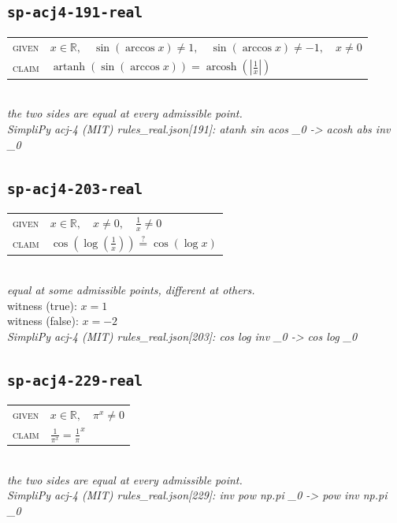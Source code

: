 \documentclass[11pt]{article}
\begin{document}
\subsection*{\texttt{sp-acj4-191-real}}
\begin{tabular}{@{}l@{\quad}l@{}}
\textsc{given} & $x \in \mathbb{R},\quad \sin\left(\arccos x\right) \neq 1,\quad \sin\left(\arccos x\right) \neq -1,\quad x \neq 0$ \\[4pt]
\textsc{claim} & $\displaystyle \operatorname{artanh}\left(\sin\left(\arccos x\right)\right) = \operatorname{arcosh}\left(\left|\frac{1}{x}\right|\right)$ \\
\end{tabular}\\[2pt]
{\small\emph{the two sides are equal at every admissible point.}}\\
\emph{SimpliPy acj-4 (MIT) rules\_real.json[191]: atanh sin acos \_0  ->  acosh abs inv \_0}\\

\subsection*{\texttt{sp-acj4-203-real}}
\begin{tabular}{@{}l@{\quad}l@{}}
\textsc{given} & $x \in \mathbb{R},\quad x \neq 0,\quad \frac{1}{x} \neq 0$ \\[4pt]
\textsc{claim} & $\displaystyle \cos\left(\log\left(\frac{1}{x}\right)\right) \overset{?}{=} \cos\left(\log x\right)$ \\
\end{tabular}\\[2pt]
{\small\emph{equal at some admissible points, different at others.}}\\
{\footnotesize\color{gray}witness (true): $x = 1$}\\
{\footnotesize\color{gray}witness (false): $x = -2$}\\
\emph{SimpliPy acj-4 (MIT) rules\_real.json[203]: cos log inv \_0  ->  cos log \_0}\\

\subsection*{\texttt{sp-acj4-229-real}}
\begin{tabular}{@{}l@{\quad}l@{}}
\textsc{given} & $x \in \mathbb{R},\quad \pi^{x} \neq 0$ \\[4pt]
\textsc{claim} & $\displaystyle \frac{1}{\pi^{x}} = \frac{1}{\pi}^{x}$ \\
\end{tabular}\\[2pt]
{\small\emph{the two sides are equal at every admissible point.}}\\
\emph{SimpliPy acj-4 (MIT) rules\_real.json[229]: inv pow np.pi \_0  ->  pow inv np.pi \_0}\\
\end{document}
